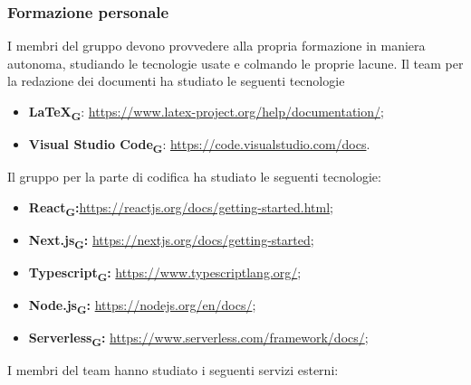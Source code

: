 \subsubsection{Formazione personale}
I membri del gruppo devono provvedere alla propria formazione in maniera autonoma, studiando le tecnologie usate e colmando le proprie lacune.
Il team per la redazione dei documenti ha studiato le seguenti tecnologie
\begin{itemize}
    \item \textbf{\LaTeX\textsubscript{\textbf{G}}}: \url{https://www.latex-project.org/help/documentation/};
    \item \textbf{Visual Studio Code}\textsubscript{\textbf{G}}: \url{https://code.visualstudio.com/docs}.
\end{itemize}
Il gruppo per la parte di codifica ha studiato le seguenti tecnologie:
\begin{itemize}
    \item \textbf{React\textsubscript{\textbf{G}}:}\href{https://reactjs.org/docs/getting-started.html}{https://reactjs.org/docs/getting-started.html};
    \item \textbf{Next.js\textsubscript{\textbf{G}}:} \href{https://nextjs.org/docs/getting-started}{https://nextjs.org/docs/getting-started};
    \item \textbf{Typescript\textsubscript{\textbf{G}}:} \href{https://www.typescriptlang.org/}{https://www.typescriptlang.org/};
    \item \textbf{Node.js\textsubscript{\textbf{G}}:} \href{https://nodejs.org/en/docs/}{https://nodejs.org/en/docs/};
    \item \textbf{Serverless\textsubscript{\textbf{G}}:} \href{https://www.serverless.com/framework/docs/}{https://www.serverless.com/framework/docs/};
\end{itemize}
I membri del team hanno studiato i seguenti servizi esterni:
